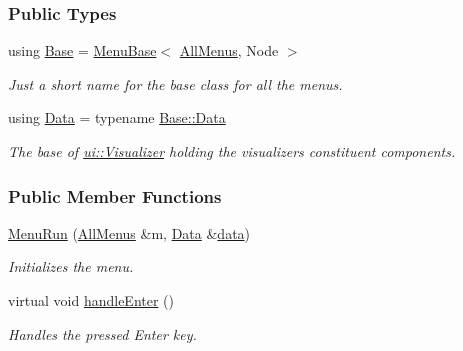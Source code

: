 \subsubsection*{Public Types}
\begin{DoxyCompactItemize}
\item 
using \hyperlink{structMenuRun_ad96732d10416a80dc4f381234f98efcb}{Base} = \hyperlink{structMenuBase}{Menu\+Base}$<$ \hyperlink{structAllMenus}{All\+Menus}, Node $>$\hypertarget{structMenuRun_ad96732d10416a80dc4f381234f98efcb}{}\label{structMenuRun_ad96732d10416a80dc4f381234f98efcb}

\begin{DoxyCompactList}\small\item\em Just a short name for the base class for all the menus. \end{DoxyCompactList}\item 
using \hyperlink{structMenuRun_a671ade0f1be77cc2322d773b5dd9c786}{Data} = typename \hyperlink{structMenuBase_a473a45fd8adbc75a9220b64753ae3837}{Base\+::\+Data}\hypertarget{structMenuRun_a671ade0f1be77cc2322d773b5dd9c786}{}\label{structMenuRun_a671ade0f1be77cc2322d773b5dd9c786}

\begin{DoxyCompactList}\small\item\em The base of \hyperlink{structui_1_1Visualizer}{ui\+::\+Visualizer} holding the visualizer\textquotesingle{}s constituent components. \end{DoxyCompactList}\end{DoxyCompactItemize}
\subsubsection*{Public Member Functions}
\begin{DoxyCompactItemize}
\item 
\hyperlink{structMenuRun_a46757ddf28176e901621dd4e56f9c1a3}{Menu\+Run} (\hyperlink{structAllMenus}{All\+Menus} \&m, \hyperlink{structMenuBase_a473a45fd8adbc75a9220b64753ae3837}{Data} \&\hyperlink{structMenuBase_a819aaaa06ede3bffbb12c1390657ef64}{data})
\begin{DoxyCompactList}\small\item\em Initializes the menu. \end{DoxyCompactList}\item 
virtual void \hyperlink{structMenuRun_aa82cb2d9112a6bf4642dada7a69f2648}{handle\+Enter} ()\hypertarget{structMenuRun_aa82cb2d9112a6bf4642dada7a69f2648}{}\label{structMenuRun_aa82cb2d9112a6bf4642dada7a69f2648}

\begin{DoxyCompactList}\small\item\em Handles the pressed Enter key. \end{DoxyCompactList}\end{DoxyCompactItemize}
